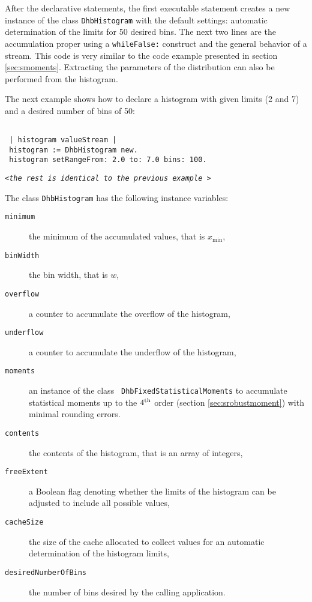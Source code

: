 \documentclass[twoside]{book}
\begin{document}
After the declarative statements, the first executable statement
creates a new instance of the class {\tt DhbHistogram} with the
default settings: automatic determination of the limits for 50
desired bins. The next two lines are the accumulation proper using
a {\tt whileFalse:} construct and the general behavior of a
stream. This code is very similar to the code example presented in
section \ref{sec:smoments}. Extracting the parameters of the
distribution can also be performed from the histogram.

\noindent The next example shows how to declare a histogram with
given limits (2 and 7) and a desired number of bins of 50:
\begin{codeExample}
\begin{verbatim}

 | histogram valueStream |
 histogram := DhbHistogram new.
 histogram setRangeFrom: 2.0 to: 7.0 bins: 100.
\end{verbatim}
\hfil {\tt<\sl the rest is identical to the previous example\tt
>}\hfil
\end{codeExample}

\noindent The class {\tt DhbHistogram} has the following instance
variables:
\begin{description}
  \item[\tt minimum] the minimum of the accumulated values, that
  is $x_{\min}$,
  \item[\tt binWidth] the bin width, that is $w$,
  \item[\tt overflow] a counter to accumulate the overflow of the histogram,
  \item[\tt underflow] a counter to accumulate the underflow of the histogram,
  \item[\tt moments] an instance of the class {\tt
  DhbFixedStatisticalMoments} to accumulate statistical moments up
  to the $4^{\mathop{\rm th}}$ order (\cf section \ref{sec:srobustmoment}) with
  minimal rounding errors.
  \item[\tt contents] the contents of the histogram, that is an
  array of integers,
  \item[\tt freeExtent] a Boolean flag denoting whether the limits
  of the histogram can be adjusted to include all possible values,
  \item[\tt cacheSize] the size of the cache allocated to collect
  values for an automatic determination of the histogram limits,
  \item[\tt desiredNumberOfBins] the number of bins desired by the
  calling application.
\end{description}
\end{document}
